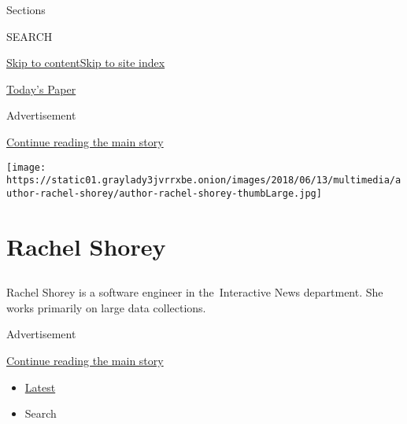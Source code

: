 Sections

SEARCH

\protect\hyperlink{site-content}{Skip to
content}\protect\hyperlink{site-index}{Skip to site index}

\href{https://myaccount.nytimes3xbfgragh.onion/auth/login?response_type=cookie\&client_id=vi}{}

\href{https://www.nytimes3xbfgragh.onion/section/todayspaper}{Today's
Paper}

Advertisement

\protect\hyperlink{after-top}{Continue reading the main story}

\texttt{[image: https://static01.graylady3jvrrxbe.onion/images/2018/06/13/multimedia/author-rachel-shorey/author-rachel-shorey-thumbLarge.jpg]}

\hypertarget{rachel-shorey}{%
\section{Rachel Shorey}\label{rachel-shorey}}

\subsection{}

Rachel Shorey is a software engineer in the~Interactive News department.
She works primarily on large data collections.

Advertisement

\protect\hyperlink{after-mid1}{Continue reading the main story}

\begin{itemize}
\tightlist
\item
  \protect\hyperlink{stream-panel}{Latest}
\item
  Search
\end{itemize}

